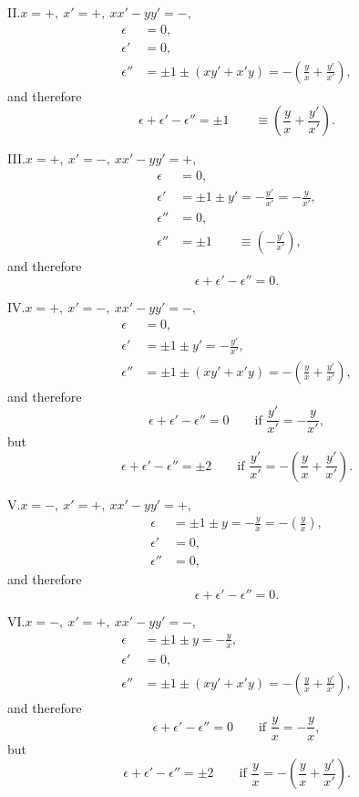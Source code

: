 \documentclass[11pt,a4paper]{book}
\begin{document}
\noindent II.\quad $x = +,\ x' = +,\ xx' - yy' = -,$
\begin{align*}
\epsilon &= 0,\\
\epsilon' &= 0,\\
\epsilon'' &= \pm 1 \pm (xy' + x'y) = -\left(\frac{y}{x} + \frac{y'}{x'}\right),
\end{align*}
and therefore
\[
\epsilon + \epsilon' - \epsilon'' = \pm 1 \qquad \equiv \left(\frac{y}{x} + \frac{y'}{x'}\right).
\]

\noindent III.\quad $x = +,\ x' = -,\ xx' - yy' = +,$
\begin{align*}
\epsilon &= 0,\\
\epsilon' &= \pm 1 \pm y' = -\frac{y'}{x'} = -\frac{y}{x'},\\
\epsilon'' &= 0,\\
\epsilon'' &= \pm 1 \qquad \equiv \left(-\frac{y'}{x'}\right),
\end{align*}
and therefore
\[
\epsilon + \epsilon' - \epsilon'' = 0.
\]

\noindent IV.\quad $x = +,\ x' = -,\ xx' - yy' = -,$
\begin{align*}
\epsilon &= 0,\\
\epsilon' &= \pm 1 \pm y' = -\frac{y'}{x'},\\
\epsilon'' &= \pm 1 \pm (xy' + x'y) = -\left(\frac{y}{x} + \frac{y'}{x'}\right),
\end{align*}
and therefore
\[
\epsilon + \epsilon' - \epsilon'' = 0\qquad\text{if } \frac{y'}{x'} = -\frac{y}{x'},
\]
but
\[
\epsilon + \epsilon' - \epsilon'' = \pm 2 \qquad\text{if } \frac{y'}{x'} = -\left(\frac{y}{x} + \frac{y'}{x'}\right).
\]

\noindent V.\quad $x = -,\ x' = +,\ xx' - yy' = +,$
\begin{align*}
\epsilon &= \pm 1 \pm y = -\frac{y}{x} = -\left(\frac{y}{x}\right),\\
\epsilon' &= 0,\\
\epsilon'' &= 0,
\end{align*}
and therefore
\[
\epsilon + \epsilon' - \epsilon'' = 0.
\]

\noindent VI.\quad $x = -,\ x' = +,\ xx' - yy' = -,$
\begin{align*}
\epsilon &= \pm 1 \pm y = -\frac{y}{x},\\
\epsilon' &= 0,\\
\epsilon'' &= \pm 1 \pm (xy' + x'y) = -\left(\frac{y}{x} + \frac{y'}{x'}\right),
\end{align*}
and therefore
\[
\epsilon + \epsilon' - \epsilon'' = 0\qquad\text{if } \frac{y}{x} = -\frac{y}{x},
\]
but
\[
\epsilon + \epsilon' - \epsilon'' = \pm 2 \qquad\text{if } \frac{y}{x} = -\left(\frac{y}{x} + \frac{y'}{x'}\right).
\]
\end{document}
